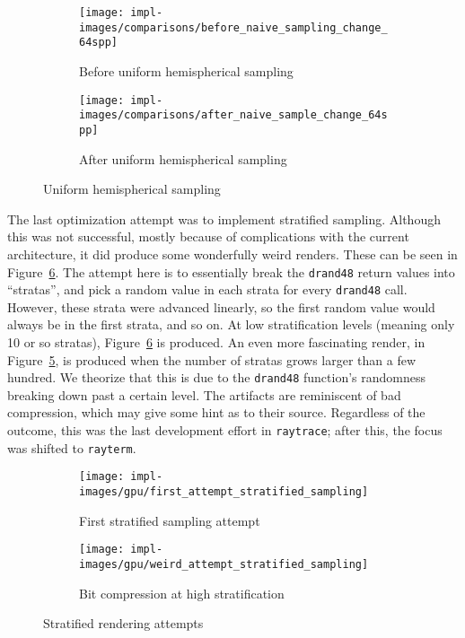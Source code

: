 \vspace{0.3em}
\begin{figure}[htb]
  \centering
  \begin{subfigure}[htb]{0.45\textwidth}
    \texttt{[image: impl-images/comparisons/before\_naive\_sampling\_change\_64spp]}
    \caption{Before uniform hemispherical sampling}
    \label{fig:rayterm-gpu_hemispherical_sampling_before}
  \end{subfigure}
  \begin{subfigure}[htb]{0.45\textwidth}
    \texttt{[image: impl-images/comparisons/after\_naive\_sample\_change\_64spp]}
    \caption{After uniform hemispherical sampling}
    \label{fig:rayterm-gpu_hemispherical_sampling_after}
  \end{subfigure}
  \caption{Uniform hemispherical sampling}
  \label{fig:rayterm-gpu_hemispherical_sampling}
\end{figure}

The last optimization attempt was to implement stratified sampling.
Although this was not successful, mostly because of complications with the current architecture, it did produce some wonderfully weird renders.
These can be seen in Figure~\ref{fig:rayterm-gpu_stratified}.
The attempt here is to essentially break the \texttt{drand48} return values into ``stratas'', and pick a random value in each strata for every \texttt{drand48} call.
However, these strata were advanced linearly, so the first random value would always be in the first strata, and so on.
At low stratification levels (meaning only 10 or so stratas), Figure~\ref{fig:rayterm-gpu_stratified} is produced.
An even more fascinating render, in Figure~\ref{fig:rayterm-gpu_bit_compression}, is produced when the number of stratas grows larger than a few hundred.
We theorize that this is due to the \texttt{drand48} function's randomness breaking down past a certain level.
The artifacts are reminiscent of bad compression, which may give some hint as to their source.
Regardless of the outcome, this was the last development effort in \texttt{raytrace}; after this, the focus was shifted to \texttt{rayterm}.

\vspace{0.3em}
\begin{figure}[htb]
  \centering
  \begin{subfigure}[htb]{0.45\textwidth}
    \texttt{[image: impl-images/gpu/first\_attempt\_stratified\_sampling]}
    \caption{First stratified sampling attempt}
    \label{fig:rayterm-gpu_stratified}
  \end{subfigure}
  \begin{subfigure}[htb]{0.45\textwidth}
    \texttt{[image: impl-images/gpu/weird\_attempt\_stratified\_sampling]}
    \caption{Bit compression at high stratification}
    \label{fig:rayterm-gpu_bit_compression}
  \end{subfigure}
  \caption{Stratified rendering attempts}
  \label{fig:rayterm-gpu_stratified}
\end{figure}

